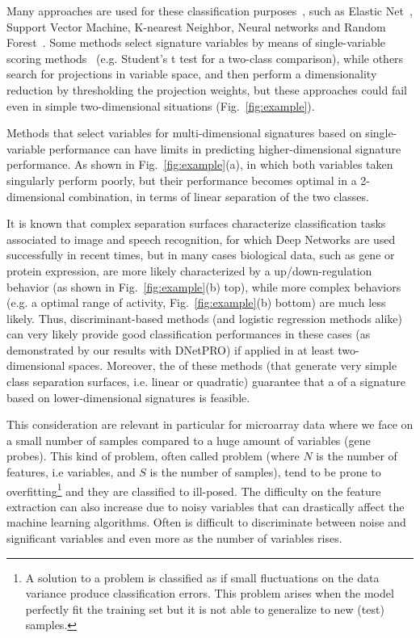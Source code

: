 \documentclass{standalone}
\begin{document}
Many approaches are used for these classification purposes~\cite{Guyon2002}, such as Elastic Net~\cite{Hughey2015}, Support Vector Machine, K-nearest Neighbor, Neural networks and Random Forest~\cite{Pang2012}.
Some methods select signature variables by means of single-variable scoring methods~\cite{Eckhard2012, Hocking1976} (e.g. Student's t test for a two-class comparison), while others search for projections in variable space, and then perform a dimensionality reduction by thresholding the projection weights, but these approaches could fail even in simple two-dimensional situations (Fig.~\ref{fig:example}).

Methods that select variables for multi-dimensional signatures based on single-variable performance can have limits in predicting higher-dimensional signature performance.
As shown in Fig.~\ref{fig:example}(a), in which both variables taken singularly perform poorly, but their performance becomes optimal in a 2-dimensional combination, in terms of linear separation of the two classes.

It is known that complex separation surfaces characterize classification tasks associated to image and speech recognition, for which Deep Networks are used successfully in recent times, but in many cases biological data, such as gene or protein expression, are more likely characterized by a up/down-regulation behavior (as shown in Fig.~\ref{fig:example}(b) top), while more complex behaviors (e.g. a  optimal range of activity, Fig.~\ref{fig:example}(b) bottom) are much less likely.
Thus, discriminant-based methods (and logistic regression methods alike) can very likely provide good classification performances in these cases (as demonstrated by our results with DNetPRO) if applied in at least two-dimensional spaces.
Moreover, the  of these methods (that generate very simple class separation surfaces, i.e. linear or quadratic) guarantee that a  of a signature based on lower-dimensional signatures is feasible.

This consideration are relevant in particular for microarray data where we face on a small number of samples compared to a huge amount of variables (gene probes).
This kind of problem, often called  problem (where $N$ is the number of features, i.e variables, and $S$ is the number of samples), tend to be prone to overfitting\footnote{
  A solution to a problem is classified as  if small fluctuations on the data variance produce classification errors.
  This problem arises when the model perfectly fit the training set but it is not able to generalize to new (test) samples.
} and they are classified to ill-posed.
The difficulty on the feature extraction can also increase due to noisy variables that can drastically affect the machine learning algorithms.
Often is difficult to discriminate between noise and significant variables and even more as the number of variables rises.
\end{document}
